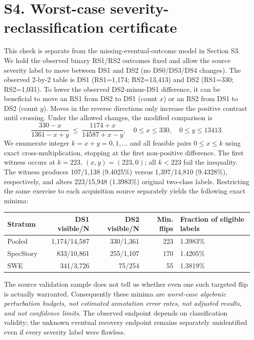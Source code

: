 \documentclass[10pt,a4paper]{article}
\begin{document}
\section*{S4. Worst-case severity-reclassification certificate}
This check is separate from the missing-eventual-outcome model in Section S3. We hold the observed binary RS1/RS2 outcomes fixed and allow the source severity label to move between DS1 and DS2 (no DS0/DS3/DS4 changes). The observed 2-by-2 table is DS1 (RS1=1,174; RS2=13,413) and DS2 (RS1=330; RS2=1,031). To lower the observed DS2-minus-DS1 difference, it can be beneficial to move an RS1 from DS2 to DS1 (count $x$) or an RS2 from DS1 to DS2 (count $y$). Moves in the reverse directions only increase the positive contrast until crossing. Under the allowed changes, the modified comparison is
\[
\frac{330-x}{1361-x+y}\ \leq\ \frac{1174+x}{14587+x-y},\quad 0\leq x\leq330,\quad 0\leq y\leq13413.
\]
We enumerate integer $k=x+y=0,1,\ldots$ and all feasible pairs $0\leq x\leq k$ using exact cross-multiplication, stopping at the first non-positive difference. The first witness occurs at $k=223$, $(x,y)=(223,0)$; all $k<223$ fail the inequality. The witness produces 107/1,138 (9.4025\%) versus 1,397/14,810 (9.4328\%), respectively, and alters 223/15,948 (1.3983\%) original two-class labels. Restricting the same exercise to each acquisition source separately yields the following exact minima:
\begin{center}
\begin{tabularx}{\linewidth}{@{}lrrrY@{}}
\toprule Stratum & DS1 visible/N & DS2 visible/N & Min. flips & Fraction of eligible labels\\\midrule
Pooled & 1,174/14,587 & 330/1,361 & 223 & 1.3983\%\\
SpecStory & 833/10,861 & 255/1,107 & 170 & 1.4205\%\\
SWE & 341/3,726 & 75/254 & 55 & 1.3819\%\\\bottomrule
\end{tabularx}
\end{center}
The source validation sample does not tell us whether even one such targeted flip is actually warranted. Consequently these minima are \emph{worst-case algebraic perturbation budgets, not estimated annotation error rates, not adjusted results, and not confidence limits}. The observed endpoint depends on classification validity; the unknown eventual recovery endpoint remains separately unidentified even if every severity label were flawless.
\end{document}

